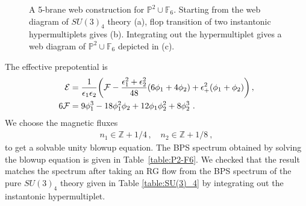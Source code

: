 \begin{figure}
	\centering
	\begin{subfigure}[b]{0.32\textwidth}
		\centering
		\caption{}
	\end{subfigure}
	\begin{subfigure}[b]{0.32\textwidth}
		\centering
		\caption{}
	\end{subfigure}
	\begin{subfigure}[b]{0.32\textwidth}
		\centering
		\caption{}
	\end{subfigure}
	\caption{A 5-brane web construction for $ \mathbb{P}^2 \cup \mathbb{F}_6 $. Starting from the web diagram of $ SU(3)_4 $ theory (a), flop transition of two instantonic hypermultiplets gives (b). Integrating out the hypermultiplet gives a web diagram of $ \mathbb{P}^2 \cup \mathbb{F}_6 $ depicted in (c).} \label{fig:P2-F6}
\end{figure}

The effective prepotential is
\begin{align}
\mathcal{E} &= \frac{1}{\epsilon_1 \epsilon_2} \qty( \mathcal{F} - \frac{\epsilon_1^2 + \epsilon_2^2}{48}(6\phi_1 + 4\phi_2) + \epsilon_+^2 (\phi_1 + \phi_2) ) \, ,  \nonumber \\
6\mathcal{F} &= 9\phi_1^3 - 18\phi_1^2 \phi_2 + 12\phi_1 \phi_2^2 + 8\phi_2^3 \ .
\end{align}
We choose the magnetic fluxes
\begin{align}
n_1 \in \mathbb{Z} + 1/4 \, , \quad
n_2 \in \mathbb{Z} + 1/8\ ,
\end{align}
to get a solvable unity blowup equation. The BPS spectrum obtained by solving the blowup equation is given in Table~\ref{table:P2-F6}.  We checked that the result matches the spectrum after taking an RG flow from the BPS spectrum of the pure $ SU(3)_4 $ theory given in Table \ref{table:SU(3)_4} by integrating out the instantonic hypermultiplet.

